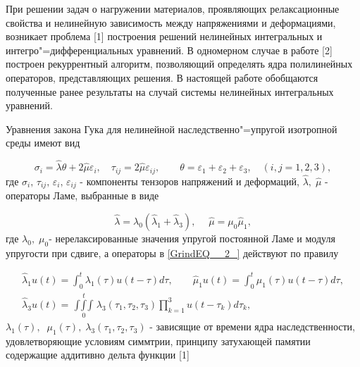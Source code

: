 \vzmscaption



При решении задач о нагружении материалов, проявляющих релаксационные свойства и нелинейную зависимость между напряжениями и деформациями, возникает проблема [1] построения решений  нелинейных интегральных и интегро"=дифференциальных уравнений. В одномерном случае в работе [2] построен рекуррентный алгоритм, позволяющий определять ядра полилинейных операторов, представляющих решения. В настоящей работе обобщаются полученные ранее результаты на случай системы нелинейных интегральных уравнений.

Уравнения закона Гука для нелинейной наследственно"=упругой изотропной среды имеют вид

\begin{equation} \label{GrindEQ__1_} \sigma _{i} =\hat{\lambda }\theta +2\hat{\mu }\varepsilon _{i} ,\quad \tau _{ij} =2\hat{\mu }\varepsilon _{ij} ,\quad \quad \theta =\varepsilon _{1} +\varepsilon _{2} +\varepsilon _{3} ,\quad (i,j=1,2,3), \end{equation}
где $\sigma _{i} ,\, \tau _{ij} ,\, \varepsilon _{i} ,\, \varepsilon _{ij} $ - компоненты тензоров напряжений и деформаций, $\hat{\lambda },\; \hat{\mu }$ - операторы Ламе, выбранные в виде

\begin{equation} \label{GrindEQ__2_} \hat{\lambda }=\lambda _{0} (\hat{\lambda }_{1} +\hat{\lambda }_{3} ),\quad \; \hat{\mu }=\mu _{0} \hat{\mu }_{1} , \end{equation}
где $\lambda _{0} ,\; \mu _{0} $- нерелаксированные значения упругой постоянной Ламе и модуля упругости при сдвиге, а операторы в \eqref{GrindEQ__2_} действуют по правилу

\begin{equation} \label{GrindEQ__3_} \begin{array}{l} {\hat{\lambda }_{1} u(t)=\int _{0}^{t}\lambda _{1}  (\tau )u(t-\tau )d\tau ,\quad \quad \hat{\mu }_{1} u(t)=\int _{0}^{t}\mu _{1}  (\tau )u(t-\tau )d\tau ,} \\ {\hat{\lambda }_{3} u(t)=\mathop{\int \int \int    }\limits_{0}^{t} \lambda _{3} (\tau _{1} ,\tau _{2} ,\tau _{3} )\prod _{k=1}^{3}u(t-\tau _{k} )d\tau _{k}  ,} \end{array} \end{equation}
$\lambda _{1} (\tau ),\; \; \mu _{1} (\tau ),\; \lambda _{3} (\tau _{1} ,\tau _{2} ,\tau _{3} )$ - зависящие от времени ядра наследственности, удовлетворяющие условиям симмтрии, принципу затухающей памятии содержащие аддитивно дельта функции [1]

